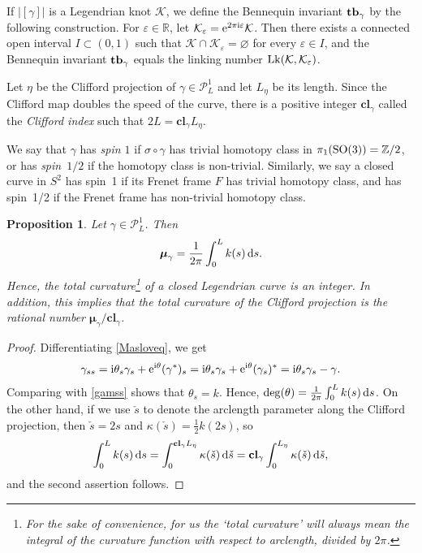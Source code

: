\documentclass[pdftex]{sigma}
\newcommand\Legu{ {\mathcal P}^1} %
\newcommand\kk{k} %
\def\ri{\mathrm{i}}
\newcommand{\sdown}{\check{s}} %
\def\gam{\gamma} %
\def\R{\mathbb R}
\def\Z{\mathbb Z}
\newcommand\cl{\mathbf{cl}}
\numberwithin{equation}{section}
\newtheorem{Proposition}[Theorem]{Proposition}
 { \theoremstyle{definition}
\newtheorem{Definition}[Theorem]{Definition}
\newtheorem{Note}[Theorem]{Note}
\newtheorem{Example}[Theorem]{Example}
\newtheorem{Remark}[Theorem]{Remark} }
\begin{document}
If $|[\gam]|$ is a Legendrian knot ${\mathcal K}$, we define the Bennequin invariant ${\bf tb}_{\gamma}$ by the following construction.
For $\varepsilon\in \R$, let ${\mathcal K}_{\varepsilon}={\rm e}^{2\pi \ri\varepsilon}{\mathcal K}$. Then there exists
a connected open interval $I \subset (0,1)$ such that ${\mathcal K}\cap {\mathcal K}_{\varepsilon}=\varnothing$ for every $\varepsilon\in I$, and the Bennequin invariant ${\bf tb}_{\gamma}$ equals the linking number ${\rm Lk}({\mathcal K}, {\mathcal K}_{\varepsilon})$.

\begin{Definition}
Let $\eta$ be the Clifford projection of $\gam\in \Legu_L$ and let $L_{\eta}$ be its length. Since the Clifford map doubles the speed of the curve, there is a positive integer $\cl_{\gamma}$ called the {\it Clifford index}
such that $2L=\cl_{\gamma}L_{\eta}$.

We say that $\gam$ has {\it spin $1$} if $\sigma\circ \gam$ has trivial homotopy class in $\pi_1({\rm SO}(3)) =\Z/2$, or has {\it spin~$1/2$} if the homotopy class is non-trivial. Similarly, we say a closed curve in $S^2$ has spin~1 if its Frenet frame $F$ has trivial homotopy class,
and has spin~1/2 if the Frenet frame has non-trivial homotopy class.
\end{Definition}

\begin{Proposition}\label{Maslov} Let $\gam\in \Legu_L$. Then
\[{\boldsymbol \mu}_{\gamma}=\frac{1}{2\pi}\int_0^L \kk(s)\,{\rm d}s.\]
Hence, the total curvature\footnote{For the sake of convenience, for us the `total curvature' will always mean the integral of the curvature function with respect to arclength, {\em divided by} $2\pi$.} of a closed Legendrian curve is an integer. In addition, this implies that the total curvature of the Clifford projection is the rational number ${\boldsymbol \mu}_{\gamma}/\cl_{\gamma}$.
\end{Proposition}

\begin{proof} Differentiating \eqref{Masloveq}, we get
\[\gam_{ss}=\ri\theta_s \gam_s+{\rm e}^{\ri\theta}(\gam^*)_s=\ri\theta_s \gam_s+{\rm e}^{\ri\theta}(\gam_s)^*=\ri\theta_s \gam_s-\gam.\]
Comparing with \eqref{gamss} shows that $\theta_s=\kk$. Hence, $\operatorname{deg} (\theta)=\frac{1}{2\pi}\int_0^L \kk(s) \, {\rm d}s$.
On the other hand, if we use $\sdown$ to denote the arclength parameter along the Clifford projection, then $\sdown=2s$ and $\kappa(\sdown) = \tfrac12 \kk(2s)$, so
\[\int_0^L \kk(s)\,{\rm d}s = \int_0^{\cl_\gamma L_\eta} \kappa(\sdown)\,{\rm d}\sdown = \cl_\gamma \int_0^{L_\eta} \kappa(\sdown)\,{\rm d}\sdown,\]
and the second assertion follows.
\end{proof}
\end{document}
